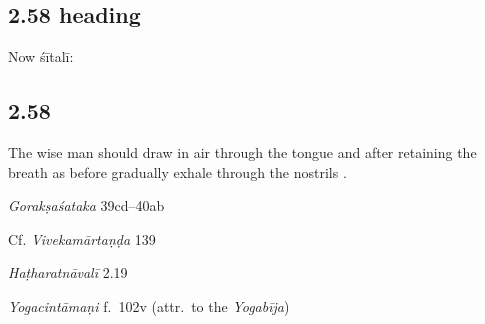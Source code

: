 \begin{ekdosis}
\begin{philcomm}[hp02_057]
\end{philcomm}

\subsection*{2.58 heading}
\begin{translation}[hp02_058a]
Now śītalī:
\end{translation}


\subsection*{2.58}
\begin{translation}[hp02_058]
The wise man should draw in air through the tongue and after retaining the breath as before gradually exhale through the nostrils .
\end{translation}

\begin{sources}[hp02_058]
\emph{Gorakṣaśataka} 39cd–40ab

\begin{versinnote}
\end{versinnote}

Cf. \emph{Vivekamārtaṇḍa} 139
\begin{versinnote}
\end{versinnote}
\end{sources}

\begin{testimonia}[hp02_058]
\emph{Haṭharatnāvalī} 2.19
\begin{versinnote}
\end{versinnote}

\emph{Yogacintāmaṇi} f.~102v (attr.~to the \emph{Yogabīja})
\begin{versinnote}
\end{versinnote}


\end{testimonia}
\end{ekdosis}
